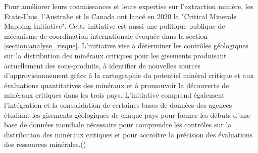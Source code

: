 Pour améliorer leurs connaissances et leurs expertise sur l'extraction minière, les Etats-Unis, l'Australie et le Canada ont lancé en 2020 la "Critical Minerals Mapping Initiative". Cette initiative est aussi une politique publique de mécanisme de coordination internationale évoquée dans la section \ref{section:analyse_risque}.\smallbreak
L'initiative vise à déterminer les contrôles géologiques sur la distribution des minéraux critiques pour les gisements produisant actuellement des sous-produits, à identifier de nouvelles sources d'approvisionnement grâce à la cartographie du potentiel minéral critique et aux évaluations quantitatives des minéraux et à promouvoir la découverte de minéraux critiques dans les trois pays. L'initiative comprend également l'intégration et la consolidation de certaines bases de données des agences étudiant les gisements géologiques de chaque pays pour former les débuts d'une base de données mondiale nécessaire pour comprendre les contrôles sur la distribution des minéraux critiques et pour accroître la précision des évaluations des ressources minérales.(\cite{usgs_critical_2020})\\
